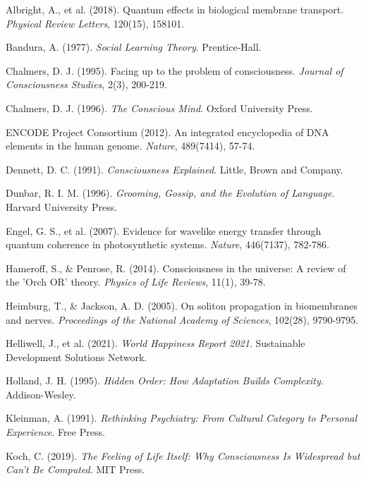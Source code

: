 \documentclass[12pt,a4paper]{article}
\begin{document}
\begin{thebibliography}{99}

Albright, A., et al. (2018). Quantum effects in biological membrane transport. \textit{Physical Review Letters}, 120(15), 158101.

Bandura, A. (1977). \textit{Social Learning Theory}. Prentice-Hall.

Chalmers, D. J. (1995). Facing up to the problem of consciousness. \textit{Journal of Consciousness Studies}, 2(3), 200-219.

Chalmers, D. J. (1996). \textit{The Conscious Mind}. Oxford University Press.

ENCODE Project Consortium (2012). An integrated encyclopedia of DNA elements in the human genome. \textit{Nature}, 489(7414), 57-74.

Dennett, D. C. (1991). \textit{Consciousness Explained}. Little, Brown and Company.

Dunbar, R. I. M. (1996). \textit{Grooming, Gossip, and the Evolution of Language}. Harvard University Press.

Engel, G. S., et al. (2007). Evidence for wavelike energy transfer through quantum coherence in photosynthetic systems. \textit{Nature}, 446(7137), 782-786.

Hameroff, S., \& Penrose, R. (2014). Consciousness in the universe: A review of the 'Orch OR' theory. \textit{Physics of Life Reviews}, 11(1), 39-78.

Heimburg, T., \& Jackson, A. D. (2005). On soliton propagation in biomembranes and nerves. \textit{Proceedings of the National Academy of Sciences}, 102(28), 9790-9795.

Helliwell, J., et al. (2021). \textit{World Happiness Report 2021}. Sustainable Development Solutions Network.

Holland, J. H. (1995). \textit{Hidden Order: How Adaptation Builds Complexity}. Addison-Wesley.

Kleinman, A. (1991). \textit{Rethinking Psychiatry: From Cultural Category to Personal Experience}. Free Press.

Koch, C. (2019). \textit{The Feeling of Life Itself: Why Consciousness Is Widespread but Can't Be Computed}. MIT Press.


\end{thebibliography}
\end{document}

